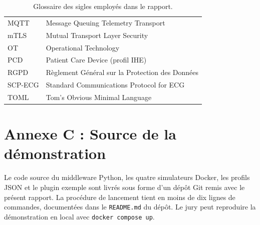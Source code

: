 \begin{table}[!htbp]
\begin{tabular}{p{} p{}}
MQTT & Message Queuing Telemetry Transport \\
mTLS & Mutual Transport Layer Security \\
OT & Operational Technology \\
PCD & Patient Care Device (profil IHE) \\
RGPD & Règlement Général sur la Protection des Données \\
SCP-ECG & Standard Communications Protocol for ECG \\
TOML & Tom's Obvious Minimal Language \\
\bottomrule
\end{tabular}
\caption{Glossaire des sigles employés dans le rapport.}
\label{tab:glossaire-rapport}
\end{table}

\section*{Annexe C : Source de la démonstration}

Le code source du middleware Python, les quatre simulateurs Docker, les profils JSON et le plugin exemple sont livrés sous forme d'un dépôt Git remis avec le présent rapport. La procédure de lancement tient en moins de dix lignes de commandes, documentées dans le \texttt{README.md} du dépôt. Le jury peut reproduire la démonstration en local avec \texttt{docker compose up}.
